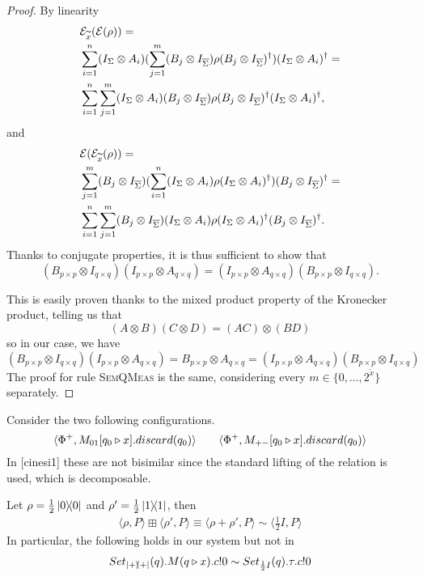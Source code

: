 \begin{proof}
	By linearity 
	\begin{align*}
	&\mathcal{E}_{\widetilde{x}}(\mathcal{E}(\rho)) =\\ 
	&\sum_{i = 1}^{n} (I_{\Sigma} \otimes A_i) (\sum_{j = 1}^{m} (B_j \otimes I_{\overline{\Sigma}}) \rho (B_j \otimes I_{\overline{\Sigma}})^{\dagger}) (I_{\Sigma} \otimes A_i)^{\dagger} =\\
	&\sum_{i = 1}^{n} \sum_{j = 1}^{m} (I_{\Sigma} \otimes A_i) (B_j \otimes I_{\overline{\Sigma}}) \rho (B_j \otimes I_{\overline{\Sigma}})^{\dagger} (I_{\Sigma} \otimes A_i)^{\dagger},
	\end{align*}
	and
	\begin{align*}
	&\mathcal{E}(\mathcal{E}_{\widetilde{x}}(\rho)) =\\
	&\sum_{j = 1}^{m} (B_j \otimes I_{\overline{\Sigma}}) (\sum_{i = 1}^{n} (I_{\Sigma} \otimes A_i) \rho (I_{\Sigma} \otimes A_i)^{\dagger}) (B_j \otimes I_{\overline{\Sigma}})^{\dagger} =\\
	&\sum_{i = 1}^{n} \sum_{j = 1}^{m} (B_j \otimes I_{\overline{\Sigma}}) (I_{\Sigma} \otimes A_i) \rho (I_{\Sigma} \otimes A_i)^{\dagger} (B_j \otimes I_{\overline{\Sigma}})^{\dagger}.
	\end{align*}
	Thanks to conjugate properties, it is thus sufficient to show that
	\[
	(B_{p\times p} \otimes I_{q\times q}) (I_{p\times p} \otimes A_{q\times q}) = (I_{p\times p} \otimes A_{q\times q}) (B_{p\times p} \otimes I_{q\times q}).
	\]
	
	This is easily proven thanks to the mixed product property of the Kronecker product, telling us that 
	\[ (A \otimes B)(C \otimes D) = (AC)\otimes(BD)
	\]
	so in our case, we have 
	\[
	(B_{p\times p} \otimes I_{q\times q}) (I_{p\times p} \otimes A_{q\times q}) = B_{p\times p} \otimes A_{q \times q} = (I_{p\times p} \otimes A_{q\times q}) (B_{p\times p} \otimes I_{q\times q})
	\]	
The proof for rule {\scshape SemQMeas} is the same, considering every $m \in \{0, \dots, 2^{\widetilde{x}}\}$ separately.
\end{proof}


\begin{example}
	Consider the two following configurations.
	\[
		\langle\Phi^+, M_{01}[q_0 \triangleright x].discard(q_0)\rangle\qquad \langle\Phi^+, M_{+-}[q_0 \triangleright x].discard(q_0)\rangle	
	\]
	In [cinesi1] these are not bisimilar since the standard lifting of the relation is used, which is decomposable.
\end{example}


\begin{example}
Let $\rho = \frac{1}{2} \ket{0}\!\!\bra{0}$ and $\rho' = \frac{1}{2} \ket{1}\!\!\bra{1}$, then
\begin{align*}
	\langle \rho, P \rangle \boxplus \langle \rho', P \rangle \equiv \langle \rho + \rho', P \rangle \sim \langle \frac{1}{2} I, P \rangle
\end{align*}
In particular, the following holds in our system but not in~\cite{Feng:2012, Deng:2012}
\begin{align*}
	Set_{\ket{+}\!\!\bra{+}}(q).M(q \triangleright x).c!0 \sim Set_{\frac{1}{2} I}(q).\tau.c!0
\end{align*}
\end{example}
